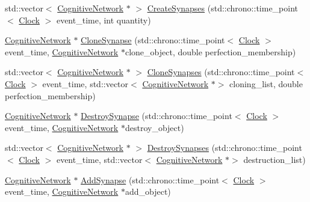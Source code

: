\begin{DoxyCompactItemize}
\item 
std\+::vector$<$ \mbox{\hyperlink{classCognitiveNetwork}{Cognitive\+Network}} $\ast$ $>$ \mbox{\hyperlink{classCognitiveNetwork_ae6ae16f401e7699032ac9459132763c0}{Create\+Synapses}} (std\+::chrono\+::time\+\_\+point$<$ \mbox{\hyperlink{universe_8h_a0ef8d951d1ca5ab3cfaf7ab4c7a6fd80}{Clock}} $>$ event\+\_\+time, int quantity)
\item 
\mbox{\hyperlink{classCognitiveNetwork}{Cognitive\+Network}} $\ast$ \mbox{\hyperlink{classCognitiveNetwork_a40f88d3ce9d386ee4db5c1e0ad84dad2}{Clone\+Synapse}} (std\+::chrono\+::time\+\_\+point$<$ \mbox{\hyperlink{universe_8h_a0ef8d951d1ca5ab3cfaf7ab4c7a6fd80}{Clock}} $>$ event\+\_\+time, \mbox{\hyperlink{classCognitiveNetwork}{Cognitive\+Network}} $\ast$clone\+\_\+object, double perfection\+\_\+membership)
\item 
std\+::vector$<$ \mbox{\hyperlink{classCognitiveNetwork}{Cognitive\+Network}} $\ast$ $>$ \mbox{\hyperlink{classCognitiveNetwork_a82fe792704bcbf7df56b3023266f5f70}{Clone\+Synapses}} (std\+::chrono\+::time\+\_\+point$<$ \mbox{\hyperlink{universe_8h_a0ef8d951d1ca5ab3cfaf7ab4c7a6fd80}{Clock}} $>$ event\+\_\+time, std\+::vector$<$ \mbox{\hyperlink{classCognitiveNetwork}{Cognitive\+Network}} $\ast$$>$ cloning\+\_\+list, double perfection\+\_\+membership)
\item 
\mbox{\hyperlink{classCognitiveNetwork}{Cognitive\+Network}} $\ast$ \mbox{\hyperlink{classCognitiveNetwork_a08b87aa9a0823355ef7cef77414dc6dc}{Destroy\+Synapse}} (std\+::chrono\+::time\+\_\+point$<$ \mbox{\hyperlink{universe_8h_a0ef8d951d1ca5ab3cfaf7ab4c7a6fd80}{Clock}} $>$ event\+\_\+time, \mbox{\hyperlink{classCognitiveNetwork}{Cognitive\+Network}} $\ast$destroy\+\_\+object)
\item 
std\+::vector$<$ \mbox{\hyperlink{classCognitiveNetwork}{Cognitive\+Network}} $\ast$ $>$ \mbox{\hyperlink{classCognitiveNetwork_a141e9e8e6337d42fc19edd75bb50e47b}{Destroy\+Synapses}} (std\+::chrono\+::time\+\_\+point$<$ \mbox{\hyperlink{universe_8h_a0ef8d951d1ca5ab3cfaf7ab4c7a6fd80}{Clock}} $>$ event\+\_\+time, std\+::vector$<$ \mbox{\hyperlink{classCognitiveNetwork}{Cognitive\+Network}} $\ast$$>$ destruction\+\_\+list)
\item 
\mbox{\hyperlink{classCognitiveNetwork}{Cognitive\+Network}} $\ast$ \mbox{\hyperlink{classCognitiveNetwork_a4bfdcd2affdfe2adb2da68dba60dff0e}{Add\+Synapse}} (std\+::chrono\+::time\+\_\+point$<$ \mbox{\hyperlink{universe_8h_a0ef8d951d1ca5ab3cfaf7ab4c7a6fd80}{Clock}} $>$ event\+\_\+time, \mbox{\hyperlink{classCognitiveNetwork}{Cognitive\+Network}} $\ast$add\+\_\+object)

\end{DoxyCompactItemize}
